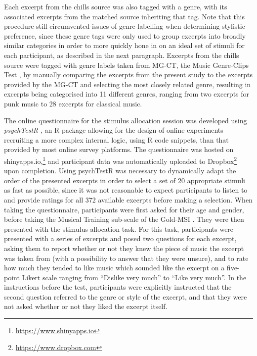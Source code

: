 Each excerpt from the chills source was also tagged with a genre, with its associated excerpts from the matched source inheriting that tag. Note that this procedure still circumvented issues of genre labelling when determining stylistic preference, since these genre tags were only used to group excerpts into broadly similar categories in order to more quickly hone in on an ideal set of stimuli for each participant, as described in the next paragraph. Excerpts from the chills source were tagged with genre labels taken from MG-CT, the Music Genre-Clips Test \parencite{bonnevilleroussy2017}, by manually comparing the excerpts from the present study to the excerpts provided by the MG-CT and selecting the most closely related genre, resulting in excerpts being categorised into 11 different genres, ranging from two excerpts for punk music to 28 excerpts for classical music.

The online questionnaire for the stimulus allocation session was developed using \emph{psychTestR} \parencite{harrison2020}, an R package allowing for the design of online experiments recruiting a more complex internal logic, using R code snippets, than that provided by most online survey platforms. The questionnaire was hosted on shinyapps.io,\footnote{\url{https://www.shinyapps.io}} and participant data was automatically uploaded to Dropbox\footnote{\url{https://www.dropbox.com}} upon completion. Using psychTestR was necessary to dynamically adapt the order of the presented excerpts in order to select a set of 20 appropriate stimuli as fast as possible, since it was not reasonable to expect participants to listen to and provide ratings for all 372 available excerpts before making a selection. When taking the questionnaire, participants were first asked for their age and gender, before taking the Musical Training sub-scale of the Gold-MSI \parencite{mullensiefen2014}. They were then presented with the stimulus allocation task. For this task, participants were presented with a series of excerpts and posed two questions for each excerpt, asking them to report whether or not they knew the piece of music the excerpt was taken from (with a possibility to answer that they were unsure), and to rate how much they tended to like music which sounded like the excerpt on a five-point Likert scale ranging from ``Dislike very much'' to ``Like very much''. In the instructions before the test, participants were explicitly instructed that the second question referred to the genre or style of the excerpt, and that they were not asked whether or not they liked the excerpt itself. 

